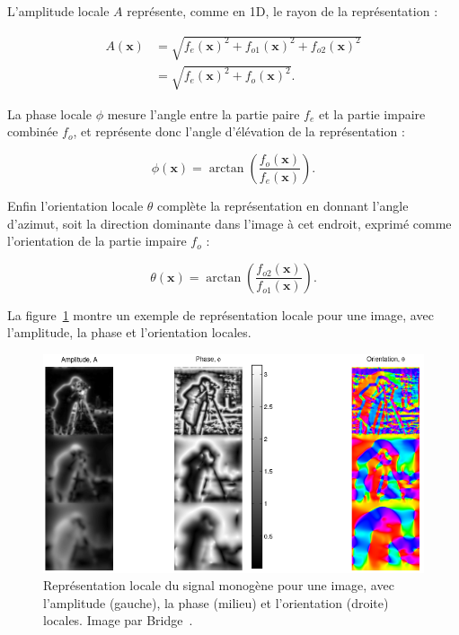 L'amplitude locale $A$ représente, comme en 1D, le rayon de la représentation :

\begin{align}
    A(\mathbf{x}) &= \sqrt{f_e(\mathbf{x})^2 + f_{o1}(\mathbf{x})^2 + f_{o2}(\mathbf{x})^2} \\
    &= \sqrt{f_e(\mathbf{x})^2 + f_o(\mathbf{x})^2}.
\end{align}

La phase locale $\phi$ mesure l'angle entre la partie paire $f_e$ et la partie impaire combinée $f_o$, et représente donc l'angle d'élévation de la représentation :

\begin{equation}
    \phi(\mathbf{x}) = \arctan\left(\frac{f_o(\mathbf{x})}{f_e(\mathbf{x})}\right).
\end{equation}

Enfin l'orientation locale $\theta$ complète la représentation en donnant l'angle d'azimut, soit la direction dominante dans l'image à cet endroit, exprimé comme l'orientation de la partie impaire $f_o$ :

\begin{equation}
    \theta(\mathbf{x}) = \arctan\left(\frac{f_{o2}(\mathbf{x})}{f_{o1}(\mathbf{x})}\right).
\end{equation}

La figure~\ref{fig:monogenic-local-representation} montre un exemple de représentation locale pour une image, avec l'amplitude, la phase et l'orientation locales.

\bigskip

\begin{figure}
    \centering
    \includegraphics[width=\textwidth]{contenu/resources/images/local_information_monogenic}
    \caption[Représentation locale du signal monogène]{Représentation locale du signal monogène pour une image, avec l'amplitude (gauche), la phase (milieu) et l'orientation (droite) locales. Image par Bridge~\cite{bridge_introduction_2018}.}
    \label{fig:monogenic-local-representation}
\end{figure}

